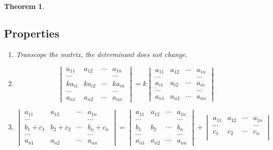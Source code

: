 \documentclass{article}
\newtheorem{theorem}{Theorem}[section]
\theoremstyle{definition}
\begin{document}
\begin{theorem}
\subsection{Properties}
\begin{enumerate}
    \item Transcope the matrix, the determinant does not change.
    \item 
    $$\begin{vmatrix}
        a_{11} & a_{12} & \cdots & a_{1n}\\
        \cdots &  &  & \cdots\\
        ka_{i1} & ka_{i2} & \cdots & ka_{in}\\
        \cdots &  &  & \cdots\\
        a_{n1} & a_{n2} & \cdots & a_{nn}
        \end{vmatrix}
    = k\begin{vmatrix}
        a_{11} & a_{12} & \cdots & a_{1n}\\
        \cdots &  &  & \cdots\\
        a_{i1} & a_{i2} & \cdots & a_{in}\\
        \cdots &  &  & \cdots\\
        a_{n1} & a_{n2} & \cdots & a_{nn}
        \end{vmatrix}$$
    \item 
    $$\begin{vmatrix}
        a_{11} & a_{12} & \cdots & a_{1n}\\
        \cdots &  &  & \cdots\\
        b_{1}+c_{1} & b_{2}+c_{2} & \cdots & b_{n}+c_{n}\\
        \cdots &  &  & \cdots\\
        a_{n1} & a_{n2} & \cdots & a_{nn}
    \end{vmatrix}
    =
    \begin{vmatrix}
        a_{11} & a_{12} & \cdots & a_{1n}\\
        \cdots &  &  & \cdots\\
        b_{1} & b_{2} & \cdots & b_{n}\\
        \cdots &  &  & \cdots\\
        a_{n1} & a_{n2} & \cdots & a_{nn}
    \end{vmatrix}
    +
    \begin{vmatrix}
        a_{11} & a_{12} & \cdots & a_{1n}\\
        \cdots &  &  & \cdots\\
        c_{1} & c_{2} & \cdots & c_{n}\\

\end{vmatrix}$$
\end{enumerate}
\end{theorem}
\end{document}
